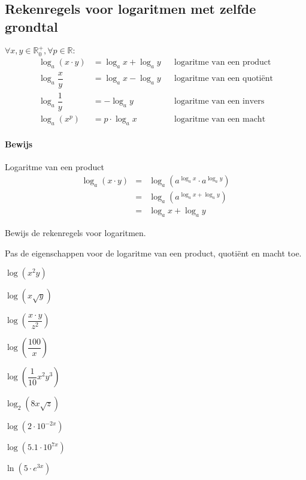 \documentclass[12pt,twoside,a4paper]{article}
\begin{document}
\subsection{Rekenregels voor logaritmen met zelfde grondtal}

\begin{mdframed}
$\forall x,y \in \mathbb{R}_0^+, \forall p\in \mathbb{R}:$
\begin{align*}
\log_a(x\cdot y) &= \log_a x + \log_a y && \mbox{logaritme van een product}\\
\log_a \dfrac{x}{y} &= \log_a x - \log_a y && \mbox{logaritme van een quotiënt}\\
\log_a \dfrac{1}{y} &= - \log_a y && \mbox{logaritme van een invers}\\
\log_a(x^p) &= p\cdot\log_a x && \mbox{logaritme van een macht}
\end{align*}
\end{mdframed}

\paragraph{Bewijs} Logaritme van een product
\begin{eqnarray*}
  \log_a(x\cdot y) &=& \log_a\left(a^{\log_a x}\cdot a^{\log_a y}\right)\\
                   &=& \log_a\left(a^{\log_a x + \log_a y}\right)\\
                   &=& \log_a x + \log_a y
\end{eqnarray*}

\begin{oefening}
Bewijs de rekenregels voor logaritmen.
\end{oefening}

\begin{oefening} %
Pas de eigenschappen voor de logaritme van een product, quotiënt en macht toe.
\begin{exlist}{2}
  \item $\log \left(x^2y\right)$
  \item $\log \left(x\sqrt{y}\right)$
  \item $\log \left(\dfrac{x\cdot y}{z^2}\right)$
  \item $\log \left(\dfrac{100}{x}\right)$
  \item $\log \left(\dfrac{1}{10}x^2y^3\right)$
  \item $\log_2 \left(8x\sqrt{z}\right)$
  \item $\log \left(2\cdot 10^{-2x}\right)$
  \item $\log \left(5.1\cdot 10^{7x}\right)$
  \item $\ln \left(5\cdot e^{3x}\right)$
\end{exlist}
\end{oefening}
\end{document}
